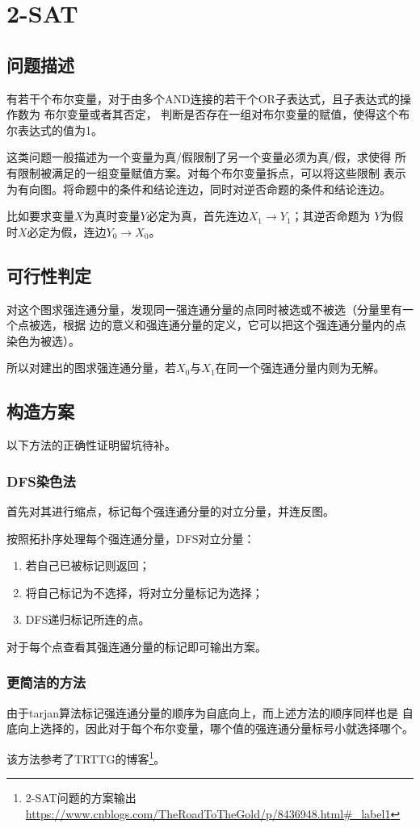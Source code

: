 \section{2-SAT}
\subsection{问题描述}
有若干个布尔变量，对于由多个AND连接的若干个OR子表达式，且子表达式的操作数为
布尔变量或者其否定，
判断是否存在一组对布尔变量的赋值，使得这个布尔表达式的值为1。

这类问题一般描述为一个变量为真/假限制了另一个变量必须为真/假，求使得
所有限制被满足的一组变量赋值方案。对每个布尔变量拆点，可以将这些限制
表示为有向图。将命题中的条件和结论连边，同时对逆否命题的条件和结论连边。

比如要求变量$X$为真时变量$Y$必定为真，首先连边$X_1\rightarrow Y_1$；其逆否命题为
$Y$为假时$X$必定为假，连边$Y_0\rightarrow X_0$。
\subsection{可行性判定}
对这个图求强连通分量，发现同一强连通分量的点同时被选或不被选（分量里有一个点被选，根据
边的意义和强连通分量的定义，它可以把这个强连通分量内的点染色为被选）。

所以对建出的图求强连通分量，若$X_0$与$X_1$在同一个强连通分量内则为无解。
\subsection{构造方案}
以下方法的正确性证明留坑待补。
\subsubsection{DFS染色法}
首先对其进行缩点，标记每个强连通分量的对立分量，并连反图。

按照拓扑序处理每个强连通分量，DFS对立分量：
\begin{enumerate}
    \item 若自己已被标记则返回；
    \item 将自己标记为不选择，将对立分量标记为选择；
    \item DFS递归标记所连的点。
\end{enumerate}
对于每个点查看其强连通分量的标记即可输出方案。
\subsubsection{更简洁的方法}
由于tarjan算法标记强连通分量的顺序为自底向上，而上述方法的顺序同样也是
自底向上选择的，因此对于每个布尔变量，哪个值的强连通分量标号小就选择哪个。

该方法参考了TRTTG的博客\footnote{2-SAT问题的方案输出
\url{https://www.cnblogs.com/TheRoadToTheGold/p/8436948.html\#\_label1}}。
